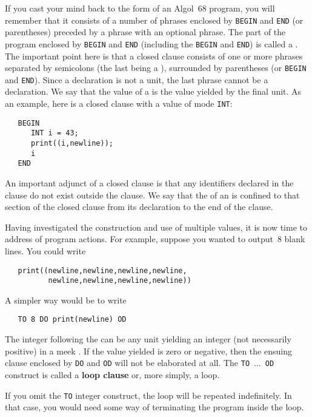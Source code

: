 If you cast your mind back to the form of an Algol~68 program, you
will remember that it consists of a number of phrases enclosed by
\verb|BEGIN| and \verb|END| (or parentheses) preceded by a
 phrase with an
optional  phrase.  The part of the
program enclosed by \verb|BEGIN| and \verb|END| (including the
\verb|BEGIN| and \verb|END|) is called a
.  The important point
here is that a closed clause consists of one or more phrases
separated by semicolons\ixtt{;} (the last  being a
), surrounded by parentheses (or \verb|BEGIN| and
\verb|END|).  Since a declaration is not a unit, the last phrase
cannot be a declaration.  We say that the value of a
 is the value yielded
by the final unit.  As an example, here is a closed clause with a
value of mode \verb|INT|:
\begin{verbatim}
   BEGIN
      INT i = 43;
      print((i,newline));
      i
   END
\end{verbatim}

An important adjunct of a closed clause is that any identifiers
declared in the clause do not exist outside the clause.  We say that
the  of an  is confined to that section of
the closed clause from its declaration to the end of the clause.

Having investigated the construction and use of multiple values, it
is now time to address  of program actions.  For
example, suppose you wanted to output~8 blank lines.  You could write
\begin{verbatim}
   print((newline,newline,newline,newline,
          newline,newline,newline,newline))
\end{verbatim}
\noindent
A simpler way would be to write
\begin{verbatim}
   TO 8 DO print(newline) OD
\end{verbatim}
\noindent
The integer following the  can be any unit yielding an
integer (not necessarily positive) in a meek
.  If the value yielded is zero or
negative, then the ensuing clause enclosed by \verb|DO| and \verb|OD|
will not be elaborated at all.  The \verb|TO|~$\ldots$~\verb|OD|
construct is called a \textbf{loop clause} or, more simply, a loop.

If you omit the \verb|TO| integer construct, the loop will be
repeated indefinitely.  In that case, you would need some way of
terminating the program inside the loop.

